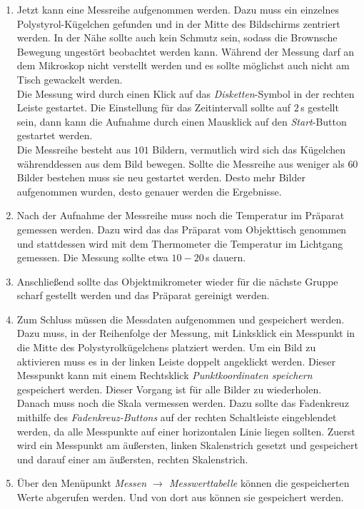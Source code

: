 \begin{enumerate}
  \item Jetzt kann eine Messreihe aufgenommen werden. Dazu muss ein einzelnes Polystyrol-Kügelchen gefunden und in der Mitte des Bildschirms zentriert werden. In der Nähe sollte auch kein Schmutz sein, sodass die Brownsche Bewegung ungestört beobachtet werden kann. Während der Messung darf an dem Mikroskop nicht verstellt werden und es sollte möglichst auch nicht am Tisch gewackelt werden.\\
  Die Messung wird durch einen Klick auf das \emph{Disketten}-Symbol in der rechten Leiste gestartet. Die Einstellung für das Zeitintervall sollte auf $2 \,$s gestellt sein, dann kann die Aufnahme durch einen Mausklick auf den \emph{Start}-Button gestartet werden.\\
  Die Messreihe besteht aus $101$ Bildern, vermutlich wird sich das Kügelchen währenddessen aus dem Bild bewegen. Sollte die Messreihe aus weniger als $60$ Bilder bestehen muss sie neu gestartet werden. Desto mehr Bilder aufgenommen wurden, desto genauer werden die Ergebnisse.

  \item Nach der Aufnahme der Messreihe muss noch die Temperatur im Präparat gemessen werden. Dazu wird das das Präparat vom Objekttisch genommen und stattdessen wird mit dem Thermometer die Temperatur im Lichtgang gemessen. Die Messung sollte etwa $10 - 20\,$s dauern.

  \item Anschließend sollte das Objektmikrometer wieder für die nächste Gruppe scharf gestellt werden und das Präparat gereinigt werden.

  \item Zum Schluss müssen die Messdaten aufgenommen und gespeichert werden.
  Dazu muss, in der Reihenfolge der Messung, mit Linksklick ein Messpunkt in die Mitte des Polystyrolkügelchens platziert werden. Um ein Bild zu aktivieren muss es in der linken Leiste doppelt angeklickt werden. Dieser Messpunkt kann mit einem Rechtsklick \emph{Punktkoordinaten speichern} gespeichert werden. Dieser Vorgang ist für alle Bilder zu wiederholen.\\
  Danach muss noch die Skala vermessen werden. Dazu sollte das Fadenkreuz mithilfe des \emph{Fadenkreuz-Buttons} auf der rechten Schaltleiste eingeblendet werden, da alle Messpunkte auf einer horizontalen Linie liegen sollten. Zuerst wird ein Messpunkt am äußersten, linken Skalenstrich gesetzt und gespeichert und darauf einer am äußersten, rechten Skalenstrich.\\

  \item Über den Menüpunkt \emph{Messen $\rightarrow$ Messwerttabelle} können die gespeicherten Werte abgerufen werden. Und von dort aus können sie gespeichert werden.

\end{enumerate}
